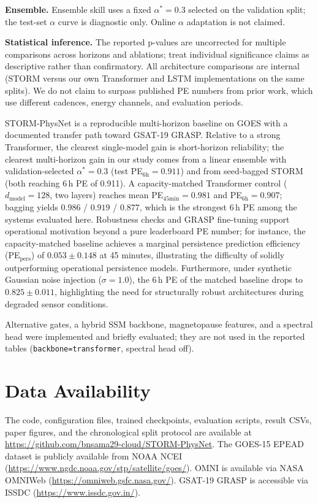 \documentclass[conference]{IEEEtran}
\begin{document}
\textbf{Ensemble.} Ensemble skill uses a fixed \(\alpha^*=0.3\) selected on the validation split; the test-set \(\alpha\) curve is diagnostic only. Online \(\alpha\) adaptation is not claimed.

\textbf{Statistical inference.} The reported p-values are uncorrected for multiple comparisons across horizons and ablations; treat individual significance claims as descriptive rather than confirmatory. All architecture comparisons are internal (STORM versus our own Transformer and LSTM implementations on the same splits). We do not claim to surpass published PE numbers from prior work, which use different cadences, energy channels, and evaluation periods.

STORM-PhysNet is a reproducible multi-horizon baseline on GOES with a documented transfer path toward GSAT-19 GRASP. Relative to a strong Transformer, the clearest single-model gain is short-horizon reliability; the clearest multi-horizon gain in our study comes from a linear ensemble with validation-selected \(\alpha^*=0.3\) (test PE\(_{6\mathrm{h}}=0.911\)) and from seed-bagged STORM (both reaching 6\,h PE of 0.911). A capacity-matched Transformer control ($d_{\mathrm{model}}=128$, two layers) reaches mean PE$_{45\mathrm{min}}=0.981$ and PE$_{6\mathrm{h}}=0.907$; bagging yields $0.986$ / $0.919$ / $0.877$, which is the strongest 6\,h PE among the systems evaluated here. Robustness checks and GRASP fine-tuning support operational motivation beyond a pure leaderboard PE number; for instance, the capacity-matched baseline achieves a marginal persistence prediction efficiency (PE\(_{\mathrm{pers}}\)) of \(0.053 \pm 0.148\) at 45 minutes, illustrating the difficulty of solidly outperforming operational persistence models. Furthermore, under synthetic Gaussian noise injection (\(\sigma=1.0\)), the 6\,h PE of the matched baseline drops to \(0.825 \pm 0.011\), highlighting the need for structurally robust architectures during degraded sensor conditions.

Alternative gates, a hybrid SSM backbone, magnetopause features, and a spectral head were implemented and briefly evaluated; they are not used in the reported tables (\texttt{backbone=transformer}, spectral head off).

\section*{Data Availability}
The code, configuration files, trained checkpoints, evaluation scripts,
result CSVs, paper figures, and the chronological split protocol are
available at
\url{https://github.com/bnsama29-cloud/STORM-PhysNet}.
The GOES-15 EPEAD dataset is publicly available from NOAA NCEI
(\url{https://www.ngdc.noaa.gov/stp/satellite/goes/}).
OMNI is available via NASA OMNIWeb
(\url{https://omniweb.gsfc.nasa.gov/}).
GSAT-19 GRASP is accessible via ISSDC
(\url{https://www.issdc.gov.in/}). 
\end{document}
